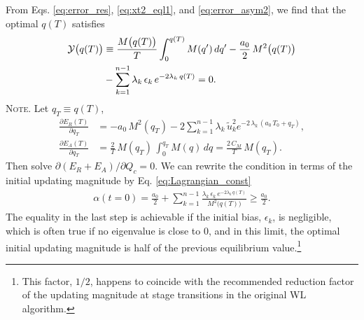 \documentclass[reprint, superscriptaddress, floatfix]{revtex4-1}
\newcommand{\note}[1]{{\color{DarkGreen}\footnotesize \textsc{Note.} #1}}
\newcommand{\Err}{E}
\begin{document}
%
From Eqs. \eqref{eq:error_res}, \eqref{eq:xt2_eql1},
and \eqref{eq:error_asym2},
we find that
the optimal $q(T)$ satisfies
%
\begin{align}
  \mathcal Y\bigl( q(T) \bigr)
  &\equiv
  \frac{ M\bigl( q(T) \bigr) } { T }
    \int_0^{q(T)} M(q') \, d q'
  -\frac{a_0}{2} \, M^2\bigl( q(T) \bigr)
  \notag \\
  &
  -\sum_{k = 1}^{n-1}
  \lambda_k \, \epsilon_k \, e^{-2\lambda_k \, q(T)}
  =0
  .
\label{eq:opt_qT}
\end{align}
%
%
\note{Let $q_T \equiv q(T)$,
$$
\begin{aligned}
  \frac{
    \partial \Err_R(T)
  }
  {
    \partial q_T
  }
  &=
  -a_0 \, M^2(q_T)
  -2
  \sum_{k=1}^{n-1} \lambda_k \,
  \tilde u_k^2 e^{-2 \, \lambda_k \, (a_0 \, T_0 + q_T)}
  ,
  \\
  \frac{
    \partial \Err_A(T)
  }
  {
    \partial q_T
  }
  &=
  \frac 2 T \,
  M(q_T) \,
  \int_0^{ q_T } M(q) \, dq
  =
  \frac{ 2 \, C_M } { T } \, M(q_T)
  .
\end{aligned}
$$
Then solve $\partial (\Err_R + \Err_A) / \partial Q_c = 0$.
}
%
We can rewrite the condition in terms of
the initial updating magnitude by Eq. \eqref{eq:Lagrangian_const} %
\begin{align}
  \alpha(t = 0)
  =
  \frac{ a_0 } { 2 }
  +
  \sum_{k = 1}^{n-1}
  \frac{
    \lambda_k \, \epsilon_k \, e^{-2\lambda_k \, q(T)}
  }{M^2\bigl( q(T) \bigr)}
  \ge
  \frac{ a_0 }
       { 2 }
  .
  \label{eq:half_alpha0}
\end{align}
%
The equality in the last step is achievable
if the initial bias, $\epsilon_k$, is negligible,
which is often true if no eigenvalue is close to $0$,
and in this limit, the optimal initial updating magnitude
is half of the previous equilibrium value.\footnote{This factor, $1/2$,
  happens to coincide with the
  recommended reduction factor of the updating magnitude
  at stage transitions
  in the original WL algorithm\cite{
  wang2001, wang2001pre}.  }
\end{document}
